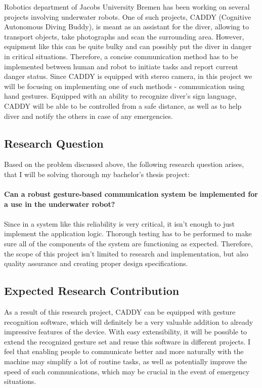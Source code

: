 \documentclass[a4paper,11pt,oneside]{article}
\begin{document}
  Robotics department of Jacobs University Bremen has been working on several projects involving underwater robots. One of such projects, CADDY (Cognitive Autonomous Diving Buddy), is meant as an assistant for the diver, allowing to transport objects, take photographs and scan the surrounding area. However, equipment like this can be quite bulky and can possibly put the diver in danger in critical situations. Therefore, a concise communication method has to be implemented between human and robot to initiate tasks and report current danger status. Since CADDY is equipped with stereo camera, in this project we will be focusing on implementing one of such methods - communication using hand gestures. Equipped with an ability to recognize diver's sign language, CADDY will be able to be controlled from a safe distance, as well as to help diver and notify the others in case of any emergencies.
  
  \subsection{Research Question}
  
  Based on the problem discussed above, the following research question arises, that I will be solving thorough my bachelor's thesis project:\\\\
  \textbf{Can a robust gesture-based communication system be implemented for a use in the underwater robot?}\\\\
  Since in a system like this reliability is very critical, it isn't enough to just implement the application logic. Thorough testing has to be performed to make sure all of the components of the system are functioning as expected. Therefore, the scope of this project isn't limited to research and implementation, but also quality assurance and creating proper design specifications.
  
  \subsection{Expected Research Contribution}
  
  As a result of this research project, CADDY can be equipped with gesture recognition software, which will definitely be a very valuable addition to already impressive features of the device. With easy extensibility, it will be possible to extend the recognized gesture set and reuse this software in different projects. I feel that enabling people to communicate better and more naturally with the machine may simplify a lot of routine tasks, as well as potentially improve the speed of such communications, which may be crucial in the event of emergency situations.
  
\end{document}
